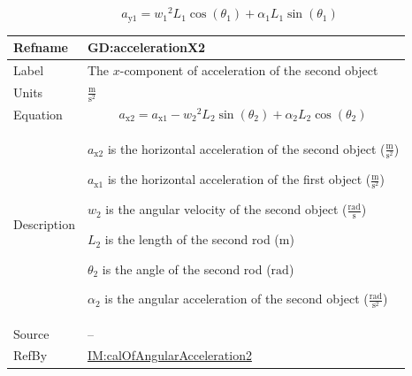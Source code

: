 \documentclass[12pt]{article}
\begin{document}
\begin{displaymath}
{a_{\text{y}1}}={w_{1}}^{2} {L_{1}} \cos\left({θ_{1}}\right)+{α_{1}} {L_{1}} \sin\left({θ_{1}}\right)
\end{displaymath}
\vspace{\baselineskip}
\noindent
\begin{minipage}{\textwidth}
\begin{tabular}{>{\raggedright}p{}>{\raggedright\arraybackslash}p{}}
\toprule \textbf{Refname} & \textbf{GD:accelerationX2}
\label{GD:accelerationX2}
\\ \midrule
Label & The $x$-component of acceleration of the second object
        
\\ \midrule
Units & $\frac{\text{m}}{\text{s}^{2}}$
        
\\ \midrule
Equation & \begin{displaymath}
           {a_{\text{x}2}}={a_{\text{x}1}}-{w_{2}}^{2} {L_{2}} \sin\left({θ_{2}}\right)+{α_{2}} {L_{2}} \cos\left({θ_{2}}\right)
           \end{displaymath}
\\ \midrule
Description & \begin{symbDescription}
              \item{${a_{\text{x}2}}$ is the horizontal acceleration of the second object ($\frac{\text{m}}{\text{s}^{2}}$)}
              \item{${a_{\text{x}1}}$ is the horizontal acceleration of the first object ($\frac{\text{m}}{\text{s}^{2}}$)}
              \item{${w_{2}}$ is the angular velocity of the second object ($\frac{\text{rad}}{\text{s}}$)}
              \item{${L_{2}}$ is the length of the second rod (${\text{m}}$)}
              \item{${θ_{2}}$ is the angle of the second rod (${\text{rad}}$)}
              \item{${α_{2}}$ is the angular acceleration of the second object ($\frac{\text{rad}}{\text{s}^{2}}$)}
              \end{symbDescription}
\\ \midrule
Source & --
         
\\ \midrule
RefBy & \hyperref[IM:calOfAngularAcceleration2]{IM:calOfAngularAcceleration2}
        
\\ \bottomrule
\end{tabular}
\end{minipage}
\end{document}
